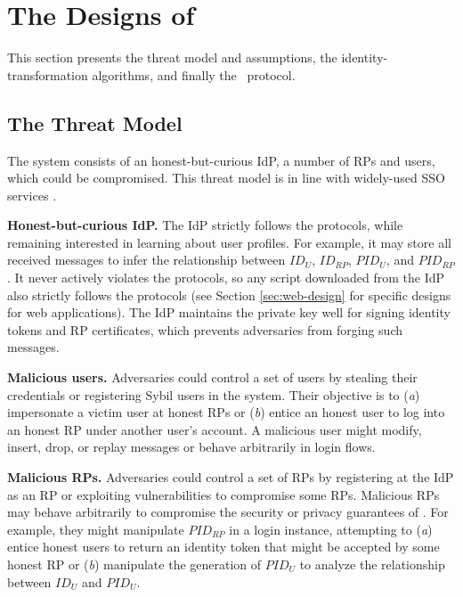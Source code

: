 \section{The Designs of \usso}
\label{sec:UPPRESSO}

This section presents the threat model and assumptions, the identity-transformation algorithms, and finally the \usso~protocol.

\subsection{The Threat Model}
\label{subsec:threatmodel}
The system consists of an honest-but-curious IdP,
 a number of RPs and users, which could be compromised. %
This threat model is in line with widely-used SSO services \cite{OpenIDConnect,rfc6749, SAML, SAMLIdentifier}.

\noindent \textbf{Honest-but-curious IdP.} The IdP strictly follows the protocols,
 while remaining interested in learning about user profiles.
For example, it may store all received messages to infer the relationship between $ID_U$, $ID_{RP}$, $PID_{U}$, and $PID_{RP}$.
It never actively violates the protocols, so any script downloaded from the IdP also strictly follows the protocols (see Section \ref{sec:web-design} for specific designs for web applications).
The IdP maintains the private key well for signing identity tokens and RP certificates, %
which prevents adversaries from forging such messages.

\noindent \textbf{Malicious users.} Adversaries could control a set of users by stealing their credentials or registering Sybil users in the system.
 Their objective is to (\emph{a}) impersonate a victim user at honest RPs or (\emph{b}) entice an honest user to log into an honest RP under another user's account.
A malicious user might modify, insert, drop, or replay messages or behave arbitrarily in login flows.

\noindent \textbf{Malicious RPs.}
Adversaries could control a set of RPs by registering at the IdP as an RP or exploiting vulnerabilities to compromise some RPs. Malicious RPs may behave arbitrarily to compromise the security or privacy guarantees of \usso.
For example, they might manipulate $PID_{RP}$ in a login instance, attempting to (\emph{a}) entice honest users to return an identity token that might be accepted by some honest RP or (\emph{b}) manipulate the generation of $PID_U$ to analyze the relationship between $ID_U$ and $PID_U$.

